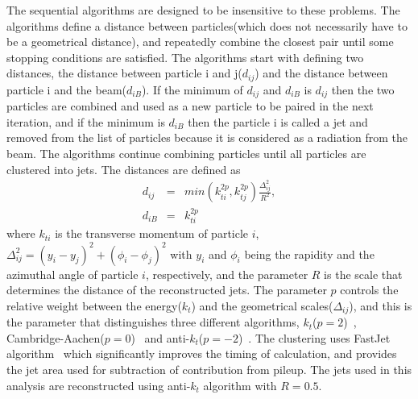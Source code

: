 The sequential algorithms are designed to be insensitive 
to these problems. The algorithms define a distance between 
particles(which does not necessarily have to be a geometrical distance), 
and repeatedly combine the closest pair until some stopping conditions 
are satisfied. The algorithms start with defining two distances,
the distance between particle i and j($d_{ij}$) 
and the distance between particle i and the beam($d_{iB}$). 
If the minimum of $d_{ij}$ and $d_{iB}$ is $d_{ij}$ then the two particles 
are combined and used as a new particle to be paired in the next iteration, 
and if the minimum is $d_{iB}$ then the particle i is called a jet and removed from 
the list of particles because it is considered as a radiation from the beam. 
The algorithms continue combining particles until all particles are 
clustered into jets. The distances are defined as 
\begin{eqnarray} 
d_{ij} 
&=&   
min \left( k_{ti}^{2p}, k_{tj}^{2p} \right) 
\frac{\Delta_{ij}^2}{R^2}, \\ 
d_{iB} 
&=&  
k_{ti}^{2p}
\end{eqnarray} 
where $k_{ti}$ is the transverse momentum of particle $i$, 
$\Delta_{ij}^2 = \left( y_i - y_j \right)^2 + \left( \phi_i - \phi_j \right)^2$ 
with $y_i$ and $\phi_i$ being the rapidity and the azimuthal angle of particle $i$,
respectively, and the parameter $R$ is the scale that determines the distance 
of the reconstructed jets. 
The parameter $p$ controls the relative weight 
between the energy($k_{t}$) and the geometrical scales($\Delta_{ij}$), and 
this is the parameter that distinguishes three different algorithms, 
$k_t$($p=2$)~\cite{Ellis:1993tq},
Cambridge-Aachen($p=0$)~\cite{Dokshitzer:1997in} and 
anti-$k_t$($p=-2$)~\cite{Cacciari:2008gp}.
The clustering uses FastJet algorithm~\cite{Cacciari:2005hq} which
significantly improves the timing of calculation, and provides  
the jet area used for subtraction of contribution from pileup. 
The jets used in this analysis are reconstructed using anti-$k_t$ algorithm
with $R = 0.5$. 

